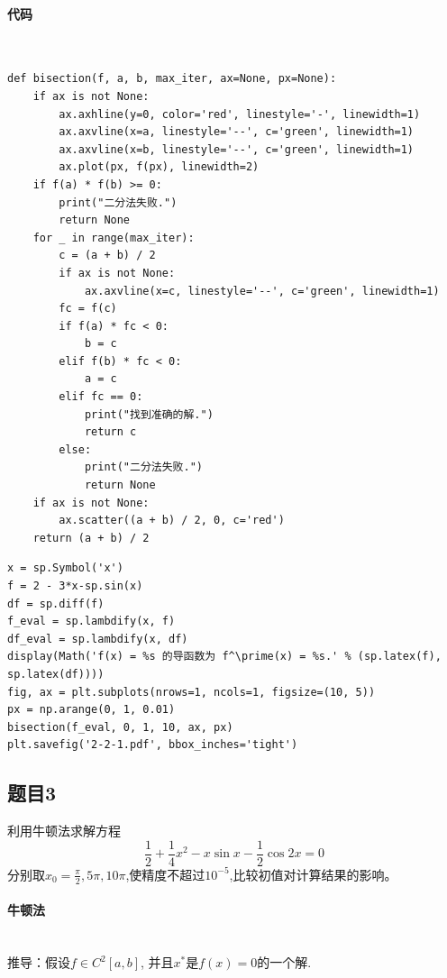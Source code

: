 \paragraph{代码}
~\\
\begin{verbatim}
def bisection(f, a, b, max_iter, ax=None, px=None):
    if ax is not None:
        ax.axhline(y=0, color='red', linestyle='-', linewidth=1)
        ax.axvline(x=a, linestyle='--', c='green', linewidth=1)
        ax.axvline(x=b, linestyle='--', c='green', linewidth=1)
        ax.plot(px, f(px), linewidth=2)
    if f(a) * f(b) >= 0:
        print("二分法失败.")
        return None
    for _ in range(max_iter):
        c = (a + b) / 2
        if ax is not None:
            ax.axvline(x=c, linestyle='--', c='green', linewidth=1)
        fc = f(c)
        if f(a) * fc < 0:
            b = c
        elif f(b) * fc < 0:
            a = c
        elif fc == 0:
            print("找到准确的解.")
            return c
        else:
            print("二分法失败.")
            return None
    if ax is not None:
        ax.scatter((a + b) / 2, 0, c='red')
    return (a + b) / 2
\end{verbatim}

\begin{verbatim}
x = sp.Symbol('x')
f = 2 - 3*x-sp.sin(x)
df = sp.diff(f)
f_eval = sp.lambdify(x, f)
df_eval = sp.lambdify(x, df)
display(Math('f(x) = %s 的导函数为 f^\prime(x) = %s.' % (sp.latex(f), sp.latex(df))))
fig, ax = plt.subplots(nrows=1, ncols=1, figsize=(10, 5))
px = np.arange(0, 1, 0.01)
bisection(f_eval, 0, 1, 10, ax, px)
plt.savefig('2-2-1.pdf', bbox_inches='tight')
\end{verbatim}


\subsection{题目3}

利用牛顿法求解方程
$$\frac{1}{2}+\frac{1}{4}x^2-x\sin x-\frac{1}{2}\cos2x=0$$
分别取$x_0=\frac{\pi}{2},5\pi,10\pi$,使精度不超过$10^{-5}$,比较初值对计算结果的影响。

\paragraph{牛顿法}
~\\
推导：假设$f\in C^2\left[a,b\right]$, 并且$x^{*}$是$f\left(x \right) = 0$的一个解.

